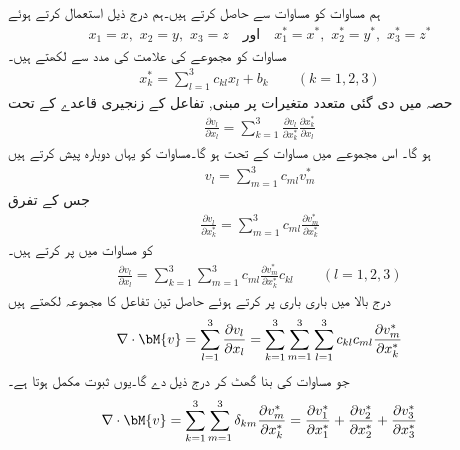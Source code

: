 ہم مساوات  کو مساوات  سے حاصل کرتے ہیں۔ہم درج ذیل استعمال کرتے ہوئے
\begin{align*}
x_1=x,\,\, x_2=y,\,\,x_3=z\quad \text{اور} \quad x_1^*=x^*,\,\,x_2^*=y^*,\,\,x_3^*=z^*
\end{align*}
مساوات  کو مجموعے کی علامت کی مدد سے لکھتے ہیں۔
\begin{align}\label{مساوات_الاحصاء_پھیلاو_عدم_تغیر_الف}
x_k^*=\sum_{l=1}^{3}c_{kl}x_l+b_k\quad \quad (k=1,2,3)
\end{align}
حصہ  میں دی گئی متعدد متغیرات پر مبنی, تفاعل کے  زنجیری قاعدے کے تحت 
\begin{align}\label{مساوات_الاحصاء_پھیلاو_عدم_تغیر_ب}
\frac{\partial v_l}{\partial x_l}=\sum_{k=1}^{3}\frac{\partial v_l}{\partial x_k^*}\frac{\partial x_k^*}{\partial x_l}
\end{align}
ہو گا۔ اس مجموعے میں مساوات  کے تحت  ہو گا۔مساوات  کو یہاں دوبارہ پیش کرتے ہیں
\begin{align*}
v_l=\sum_{m=1}^3 c_{ml} v_m^* 
\end{align*}
جس کے تفرق
\begin{align*}
\frac{\partial v_l}{\partial x_k^*}=\sum_{m=1}^{3} c_{ml} \frac{\partial v_m^*}{\partial x_k^*}
\end{align*}
کو مساوات  میں پر کرتے ہیں۔
\begin{align*}
\frac{\partial v_l}{\partial x_l}=\sum_{k=1}^{3}\sum_{m=1}^{3} c_{ml}\frac{\partial v_m^*}{\partial x_k^*}c_{kl} \quad \quad (l=1,2,3)
\end{align*}
درج بالا میں باری باری   پر کرتے ہوئے حاصل تین تفاعل کا مجموعہ لکھتے ہیں
 \begin{align*}
\nabla \cdot\bM{v}=\sum_{l=1}^{3}\frac{\partial v_l}{\partial x_l}=\sum_{k=1}^{3}\sum_{m=1}^{3}\sum_{l=1}^{3} c_{kl} c_{ml}\frac{\partial v_m^*}{\partial x_k^*}
\end{align*}
جو مساوات  کی بنا گھٹ کر درج ذیل دے گا۔یوں ثبوت مکمل ہوتا ہے۔
\begin{align}
\nabla \cdot \bM{v}=\sum_{k=1}^{3}\sum_{m=1}^{3}\delta_{km} \frac{\partial v_m^*}{\partial x_k^*}=\frac{\partial v_1^*}{\partial x_1^*}
+\frac{\partial v_2^*}{\partial x_2^*}+\frac{\partial v_3^*}{\partial x_3^*}
\end{align}

